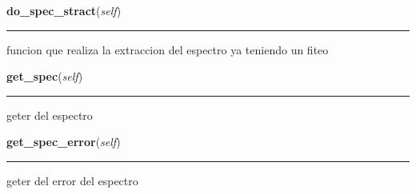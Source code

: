     \label{spectro_metria:spect:do_spec_stract}

    \vspace{0.5ex}

\hspace{.8\funcindent}\begin{boxedminipage}{\funcwidth}

    \raggedright \textbf{do\_spec\_stract}(\textit{self})

    \vspace{-1.5ex}

    \rule{\textwidth}{0.5\fboxrule}
\setlength{\parskip}{2ex}
    funcion que realiza la extraccion del espectro ya teniendo un fiteo

\setlength{\parskip}{1ex}
    \end{boxedminipage}

    \label{spectro_metria:spect:get_spec}

    \vspace{0.5ex}

\hspace{.8\funcindent}\begin{boxedminipage}{\funcwidth}

    \raggedright \textbf{get\_spec}(\textit{self})

    \vspace{-1.5ex}

    \rule{\textwidth}{0.5\fboxrule}
\setlength{\parskip}{2ex}
    geter del espectro

\setlength{\parskip}{1ex}
    \end{boxedminipage}

    \label{spectro_metria:spect:get_spec_error}

    \vspace{0.5ex}

\hspace{.8\funcindent}\begin{boxedminipage}{\funcwidth}

    \raggedright \textbf{get\_spec\_error}(\textit{self})

    \vspace{-1.5ex}

    \rule{\textwidth}{0.5\fboxrule}
\setlength{\parskip}{2ex}
    geter del error del espectro

\setlength{\parskip}{1ex}
    \end{boxedminipage}

